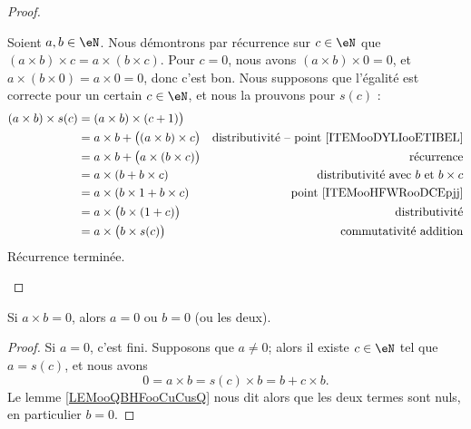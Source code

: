 \begin{proof}
\begin{subproof}
		Soient \( a,b\in \eN\). Nous démontrons par récurrence sur \( c\in \eN\) que \( (a\times b)\times c=a\times (b\times c)\). Pour \( c=0\), nous avons \( (a \times b ) \times 0 = 0 \), et \( a \times (b \times 0) = a \times 0 = 0\), donc c'est bon. Nous supposons que l'égalité est correcte pour un certain \( c \in \eN \), et nous la prouvons pour \( s(c)\) :
		\begin{subequations}
			\begin{align}
				(a\times b)\times s(c) & = (a\times b)\times (c+1) \big)                                                                           \\
				                       & = a\times b + \big( (a\times b)\times c \big)   & \text{distributivité -- point \ref{ITEMooDYLIooETIBEL}} \\
				                       & = a \times b + \big( a\times (b\times c) \big)  & \text{récurrence}                                       \\
				                       & = a \times (b + b \times c)                     & \text{distributivité avec \( b \) et \( b \times c \)}  \\
				                       & = a \times (b \times 1 + b \times c)            & \text{point \ref{ITEMooHFWRooDCEpjj}}                   \\
				                       & = a \times \big(b \times (1+c)\big)             & \text{distributivité}                                   \\
						   			   & = a \times \big(b \times s(c)\big)				 & \text{commutativité addition}                           \\
			\end{align}
		\end{subequations}
  		Récurrence terminée.
	\end{subproof}
\end{proof}

\begin{lemma}       \label{LEMooEHYEooLDudfn}
	Si \( a\times b=0\), alors \( a=0\) ou \( b=0\) (ou les deux).
\end{lemma}

\begin{proof}
	Si \( a = 0 \), c'est fini. Supposons que \( a\neq 0\); alors il existe \( c\in \eN\) tel que \( a=s(c)\), et nous avons
	\begin{equation}
		0 = a\times b = s(c)\times b = b + c\times b.
	\end{equation}
	Le lemme \ref{LEMooQBHFooCuCusQ} nous dit alors que les deux termes sont nuls, en particulier \( b = 0 \).
\end{proof}

